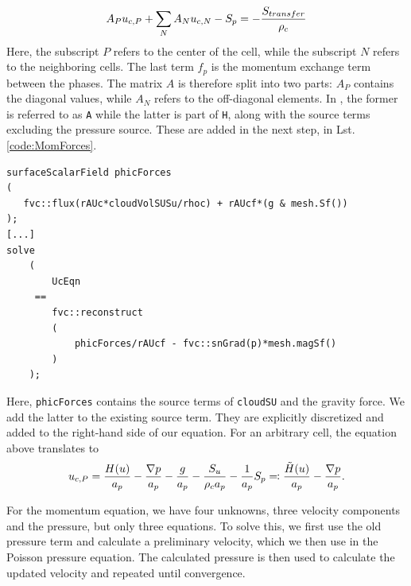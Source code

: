 \begin{align}
    A_P u_{c,P} + \sum_N A_N u_{c,N} - S_p = - \dfrac{S_{transfer}}{\rho_c} 
\end{align}
Here, the subscript $P$ refers to the center of the cell, while the subscript $N$ refers to the neighboring cells.
The last term $f_p$ is the momentum exchange term between the phases.
The matrix $A$ is therefore split into two parts: $A_P$ contains the diagonal values, while $A_N$ refers to the off-diagonal elements. In \OFns, the former is referred to as \lstinline|A| while the latter is part of \lstinline|H|, along with the source terms excluding the pressure source.
These are added in the next step, in Lst. \ref{code:MomForces}.
\begin{lstlisting}[caption = UcEqn.C, label={code:MomForces}]
surfaceScalarField phicForces
(
   fvc::flux(rAUc*cloudVolSUSu/rhoc) + rAUcf*(g & mesh.Sf())
);
[...]
solve
    (
        UcEqn
     ==
        fvc::reconstruct
        (
            phicForces/rAUcf - fvc::snGrad(p)*mesh.magSf()
        )
    );
\end{lstlisting}

Here, \lstinline|phicForces| contains the source terms of \lstinline|cloudSU| and the gravity force. We add the latter to the existing source term.
They are explicitly discretized and added to the right-hand side of our equation.
For an arbitrary cell, the equation above translates to
\begin{equation}
    u_{c,P} =  \dfrac{H(u)}{a_p} - \dfrac{\nabla p}{a_p} - \dfrac{g}{a_p} -  \dfrac{S_u}{\rho_c a_p}  -\dfrac{1}{a_p} S_p  \eqqcolon \dfrac{\tilde{H}(u)}{a_p} - \dfrac{\nabla p}{a_p}.
\end{equation}



For the momentum equation, we have four unknowns, three velocity components and the pressure, but only three equations.
To solve this, we first use the old pressure term and calculate a preliminary velocity, which we then use in the Poisson pressure equation. The calculated pressure is then used to calculate the updated velocity and repeated until convergence. 

